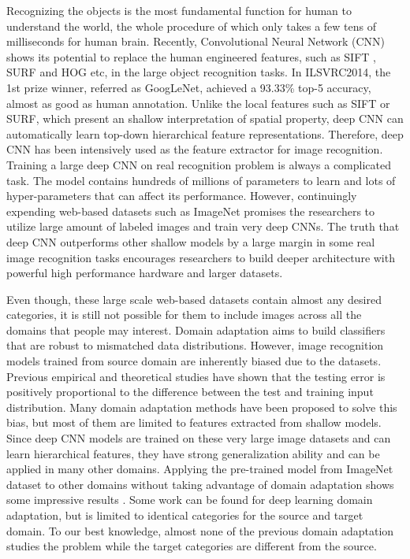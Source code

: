 ﻿Recognizing the objects is the most fundamental function for human to understand the world, the whole procedure of which only takes a few tens of milliseconds for human brain.
Recently, Convolutional Neural Network (CNN) shows its potential to replace the human engineered features, such as SIFT \cite{lowe1999object}, SURF \cite{bay2006surf} and HOG \cite{dalal2005histograms} etc, in the large object recognition tasks\cite{krizhevsky2012imagenet}\cite{zeiler2014visualizing}\cite{simonyan2014very}. In ILSVRC2014, the 1st prize winner, referred as GoogLeNet, achieved a 93.33\% top-5 accuracy, almost as good as human annotation\cite{szegedy2014going}.
Unlike the local features such as SIFT or SURF, which present an shallow interpretation of spatial property, deep CNN can automatically learn top-down hierarchical feature representations. Therefore, deep CNN has been intensively used as the feature extractor for image recognition\cite{farabet2013learning}.
Training a large deep CNN on real recognition problem is always a complicated task. The model contains hundreds of millions of parameters to learn and lots of hyper-parameters that can affect its performance. However, continuingly expending web-based datasets such as ImageNet promises the researchers to utilize large amount of labeled images and train very deep CNNs. The truth that deep CNN outperforms other shallow models by a large margin in some real image recognition tasks encourages researchers to build deeper architecture with powerful high performance hardware and larger datasets.

Even though, these large scale web-based datasets contain almost any desired categories, it is still not possible for them to include images across all the domains that people may interest.
Domain adaptation aims to build classifiers that are robust to mismatched data distributions. However, image recognition models trained from source domain are inherently biased due to the datasets. Previous empirical and theoretical studies have shown that the testing error is positively proportional to the difference between the test and training input distribution\cite{ben2007analysis}\cite{blitzer2008learning}. Many domain adaptation methods have been proposed to solve this bias, but most of them are limited to features extracted from shallow models\cite{daume2009frustratingly}\cite{yang2007adapting}\cite{aytar2011tabula}.
Since deep CNN models are trained on these very large image datasets and can learn hierarchical features, they have strong generalization ability and can be applied in many other domains. Applying the pre-trained model from ImageNet dataset to other domains without taking advantage of domain adaptation shows some impressive results\cite{Chatfield14} \cite{zeiler2014visualizing}. Some work can be found for deep learning domain adaptation, but is limited to identical categories for the source and target domain\cite{hoffman2013one}\cite{NIPS2014_Zhou}. To our best knowledge, almost none of the previous domain adaptation studies the problem while the target categories are different from the source.


